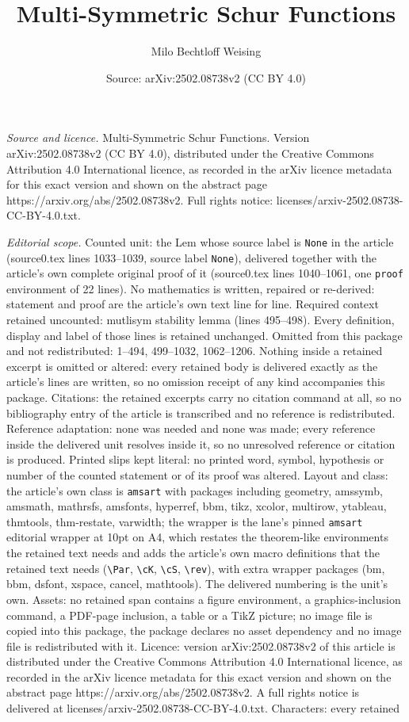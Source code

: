 \documentclass[10pt,a4paper]{amsart}
\title[Multi-Symmetric Schur Functions]{Multi-Symmetric Schur Functions}
\author{Milo Bechtloff Weising}
\date{Source: arXiv:2502.08738v2 (CC BY 4.0)}
\begin{document}
\maketitle

\noindent\emph{Source and licence.} Multi-Symmetric Schur Functions. Version arXiv:2502.08738v2 (CC BY 4.0), distributed under the Creative Commons Attribution 4.0 International licence, as recorded in the arXiv licence metadata for this exact version and shown on the abstract page https://arxiv.org/abs/2502.08738v2. Full rights notice: licenses/arxiv-2502.08738-CC-BY-4.0.txt.\par\smallskip

\noindent\textit{Editorial scope.} Counted unit: the Lem whose source label is \texttt{None} in the article (source0.tex lines 1033--1039, source label \texttt{None}), delivered together with the article's own complete original proof of it (source0.tex lines 1040--1061, one \texttt{proof} environment of 22 lines). No mathematics is written, repaired or re-derived: statement and proof are the article's own text line for line. Required context retained uncounted: mutlisym stability lemma (lines 495--498). Every definition, display and label of those lines is retained unchanged. Omitted from this package and not redistributed: 1--494, 499--1032, 1062--1206. Nothing inside a retained excerpt is omitted or altered: every retained body is delivered exactly as the article's lines are written, so no omission receipt of any kind accompanies this package. Citations: the retained excerpts carry no citation command at all, so no bibliography entry of the article is transcribed and no reference is redistributed. Reference adaptation: none was needed and none was made; every reference inside the delivered unit resolves inside it, so no unresolved reference or citation is produced. Printed slips kept literal: no printed word, symbol, hypothesis or number of the counted statement or of its proof was altered. Layout and class: the article's own class is \texttt{amsart} with packages including geometry, amssymb, amsmath, mathrsfs, amsfonts, hyperref, bbm, tikz, xcolor, multirow, ytableau, thmtools, thm-restate, varwidth; the wrapper is the lane's pinned \texttt{amsart} editorial wrapper at 10pt on A4, which restates the theorem-like environments the retained text needs and adds the article's own macro definitions that the retained text needs (\texttt{\textbackslash Par}, \texttt{\textbackslash cK}, \texttt{\textbackslash cS}, \texttt{\textbackslash rev}), with extra wrapper packages (bm, bbm, dsfont, xspace, cancel, mathtools). The delivered numbering is the unit's own. Assets: no retained span contains a figure environment, a graphics-inclusion command, a PDF-page inclusion, a table or a TikZ picture; no image file is copied into this package, the package declares no asset dependency and no image file is redistributed with it. Licence: version arXiv:2502.08738v2 of this article is distributed under the Creative Commons Attribution 4.0 International licence, as recorded in the arXiv licence metadata for this exact version and shown on the abstract page https://arxiv.org/abs/2502.08738v2. A full rights notice is delivered at licenses/arxiv-2502.08738-CC-BY-4.0.txt. Characters: every retained 
\end{document}
